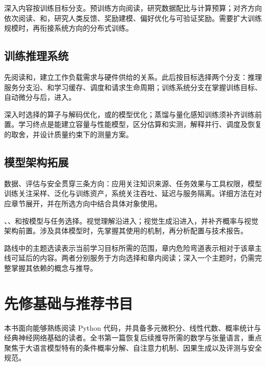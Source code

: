 深入内容按训练目标分支。预训练方向阅读，研究数据配比与计算预算；对齐方向依次阅读、和，研究人类反馈、奖励建模、偏好优化与可验证奖励。需要扩大训练规模时，再衔接系统方向的分布式训练。

\subsection*{训练推理系统}
先阅读和，建立工作负载需求与硬件供给的关系。此后按目标选择两个分支：推理服务分支沿、和学习缓存、调度和请求生命周期；训练系统分支在掌握训练目标、自动微分与后，进入。

深入时选择的算子与解码优化，或的模型优化；蒸馏与量化感知训练须补齐训练前置。学习终点是能建立容量与性能模型，区分估算和实测，解释并行、调度及恢复的取舍，并设计质量约束下的测量方案。

\subsection*{模型架构拓展}
数据、评估与安全贯穿三条方向：应用关注知识来源、任务效果与工具权限，模型训练关注采样、泛化与训练资产，系统关注吞吐、延迟与服务隔离。详细方法在对应章节展开，并在所选方向中结合具体对象使用。

、、和按模型与任务选择。视觉理解沿进入；视觉生成沿进入，并补齐概率与视觉架构前置。涉及具体模型时，先掌握其使用的机制，再分析配置与技术报告。

路线中的主题选读表示当前学习目标所需的范围，章内危险弯道表示相对于该章主线可延后的内容。两者分别服务于方向选择和章内阅读；深入一个主题时，仍需完整掌握其依赖的概念与推导。

\section*{先修基础与推荐书目}
本书面向能够熟练阅读 Python 代码，并具备多元微积分、线性代数、概率统计与经典神经网络基础的读者。全书第一篇恢复后续推导所需的数学与张量语言，重点聚焦于大语言模型特有的条件概率分解、自注意力机制、因果生成以及评测与安全规范。

